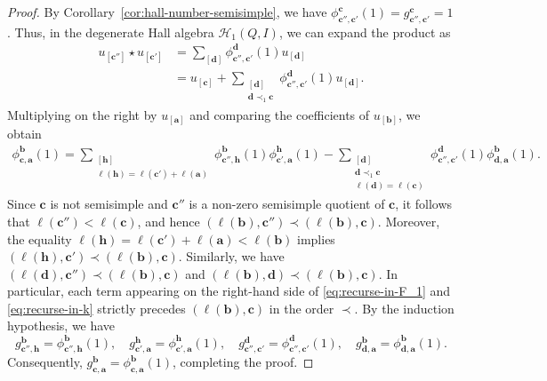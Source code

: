 \documentclass[12pt]{amsart}
\theoremstyle{remark}
\theoremstyle{definition}
\numberwithin{equation}{section}
\begin{document}
\begin{proof}
By Corollary~\ref{cor:hall-number-semisimple}, we have $\phi_{\mathbf{c}'',\mathbf{c}'}^{\mathbf{c}}(1)=g_{\mathbf{c}'',\mathbf{c}'}^{\mathbf{c}}=1$. Thus, in the degenerate Hall algebra $\mathcal{H}_1(Q,I)$, we can expand the product as
\begin{align*}u_{[\mathbf{c}'']}\star u_{[\mathbf{c}']}&= \sum_{[\mathbf{d}]} \phi_{\mathbf{c}'',\mathbf{c}'}^\mathbf{d}(1) u_{[\mathbf{d}]}\\ &= u_{[\mathbf{c}]} + \sum_{\substack{[\mathbf{d}] \\ \mathbf{d}\prec_1\mathbf{c}}} \phi_{\mathbf{c}'',\mathbf{c}'}^\mathbf{d}(1) u_{[\mathbf{d}]}.
\end{align*}
Multiplying on the right by $u_{[\mathbf{a}]}$ and comparing the coefficients of $u_{[\mathbf{b}]}$, we obtain
\begin{align}\label{eq:recurse-in-k}\phi_{\mathbf{c},\mathbf{a}}^{\mathbf{b}}(1)= \sum_{\substack{[\mathbf{h}]\\ \ell(\mathbf{h})=\ell(\mathbf{c}')+\ell(\mathbf{a})}} \phi_{\mathbf{c}'',\mathbf{h}}^{\mathbf{b}}(1) \phi_{\mathbf{c}',\mathbf{a}}^{\mathbf{h}}(1) - \sum_{\substack{[\mathbf{d}] \\ \mathbf{d}\prec_1\mathbf{c}\\ \ell(\mathbf{d})=\ell(\mathbf{c})}} \phi_{\mathbf{c}'',\mathbf{c}'}^\mathbf{d}(1) \phi_{\mathbf{d},\mathbf{a}}^{\mathbf{b}}(1).
\end{align}
Since $\mathbf{c}$ is not semisimple and $\mathbf{c}''$ is a non-zero semisimple quotient of $\mathbf{c}$, it follows that $\ell(\mathbf{c}'') < \ell(\mathbf{c})$, and hence $(\ell(\mathbf{b}), \mathbf{c}'') \prec (\ell(\mathbf{b}), \mathbf{c})$. Moreover, the equality $\ell(\mathbf{h}) = \ell(\mathbf{c}') + \ell(\mathbf{a}) < \ell(\mathbf{b})$ implies $(\ell(\mathbf{h}), \mathbf{c}') \prec (\ell(\mathbf{b}), \mathbf{c})$. Similarly, we have $(\ell(\mathbf{d}), \mathbf{c}'') \prec (\ell(\mathbf{b}), \mathbf{c})$ and $(\ell(\mathbf{b}), \mathbf{d}) \prec (\ell(\mathbf{b}), \mathbf{c})$. In particular, each term appearing on the right-hand side of \eqref{eq:recurse-in-F_1} and \eqref{eq:recurse-in-k} strictly precedes $(\ell(\mathbf{b}), \mathbf{c})$ in the  order $\prec$. By the induction hypothesis, we have\[     g_{\mathbf{c}'',\mathbf{h}}^{\mathbf{b}} = \phi_{\mathbf{c}'',\mathbf{h}}^{\mathbf{b}}(1), \quad       g_{\mathbf{c}',\mathbf{a}}^{\mathbf{h}} = \phi_{\mathbf{c}',\mathbf{a}}^{\mathbf{h}}(1), \quad      g_{\mathbf{c}'',\mathbf{c}'}^{\mathbf{d}} = \phi_{\mathbf{c}'',\mathbf{c}'}^{\mathbf{d}}(1), \quad       g_{\mathbf{d}, \mathbf{a}}^{\mathbf{b}} = \phi_{\mathbf{d}, \mathbf{a}}^{\mathbf{b}}(1).\] Consequently, $g_{\mathbf{c}, \mathbf{a}}^{\mathbf{b}} = \phi_{\mathbf{c}, \mathbf{a}}^{\mathbf{b}}(1)$, completing the proof.

\end{proof}
\end{document}
